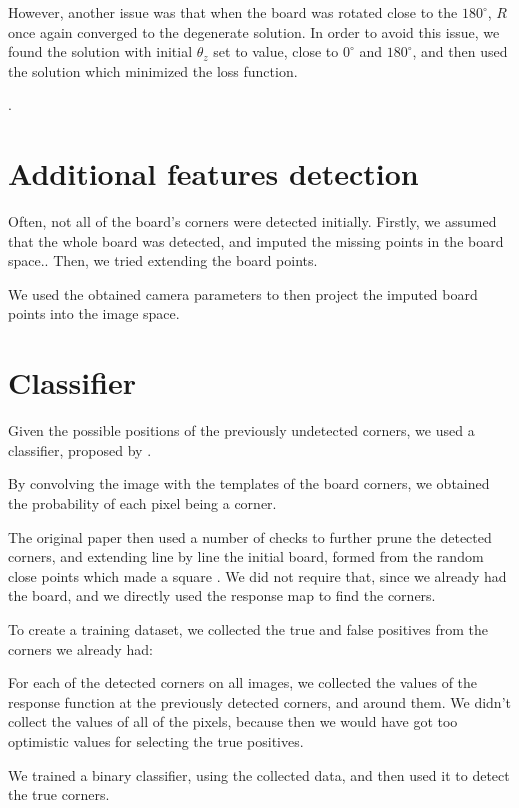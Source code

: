 However, another issue was that when the board was rotated close to the
\(180^{\circ}\), \(R\) once again converged to the degenerate solution. In order
to avoid this issue, we found the solution with initial \(\theta_z\) set to
value, close to \(0^{\circ}\) and \(180^{\circ}\), and then used the solution
which minimized the loss function.

.


\section{Additional features detection}\label{sec:additional_features_detection}

Often, not all of the board's corners were detected initially. Firstly, we
assumed that the whole board was detected, and imputed the missing points in the
board space.. Then, we tried extending the board
points.


We used the obtained camera parameters to then project the imputed board points
into the image space.

\section{Classifier}\label{sec:classifier}

Given the possible positions of the previously undetected corners, we used a
classifier, proposed by \cite{geigerAutomaticCameraRange2012}.

By convolving the image with the templates of the board corners, we obtained the
probability of
each pixel being a corner.

The original paper then used a number of checks to further prune the detected
corners, and extending line by line the initial board, formed from the
random close points which made a square .
We did not require that, since we already had the board, and we directly used
the response map to find the corners.


To create a training dataset, we collected the true and false positives from the
corners we already had:

For each of the detected corners on all images, we collected the values of the
response function at the previously detected corners, and around them.
We didn't collect the values of all of the pixels, because then we would have
got too optimistic values for selecting the true positives.


We trained a binary classifier, using the collected data, and then used it to
detect the true corners.
